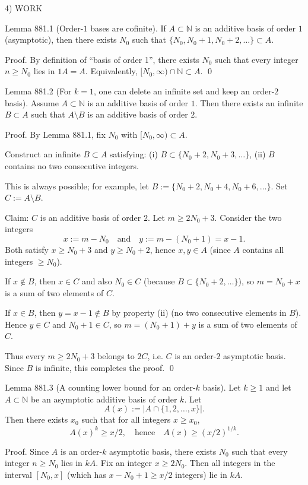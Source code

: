 4) WORK

Lemma 881.1 (Order-$1$ bases are cofinite).
If $A\subset\mathbb N$ is an additive basis of order $1$ (asymptotic), then there exists $N_0$ such that $\{N_0,N_0+1,N_0+2,\dots\}\subset A$.

Proof.
By definition of “basis of order 1”, there exists $N_0$ such that every integer $n\ge N_0$ lies in $1A=A$. Equivalently, $[N_0,\infty)\cap\mathbb N\subset A$. \qed

Lemma 881.2 (For $k=1$, one can delete an infinite set and keep an order-$2$ basis).
Assume $A\subset\mathbb N$ is an additive basis of order $1$. Then there exists an infinite $B\subset A$ such that $A\setminus B$ is an additive basis of order $2$.

Proof.
By Lemma 881.1, fix $N_0$ with $[N_0,\infty)\subset A$.

Construct an infinite $B\subset A$ satisfying:
(i) $B\subset \{N_0+2,N_0+3,\dots\}$,
(ii) $B$ contains no two consecutive integers.

This is always possible; for example, let $B:=\{N_0+2, N_0+4, N_0+6, \dots\}$.
Set $C:=A\setminus B$.

Claim: $C$ is an additive basis of order $2$.
Let $m\ge 2N_0+3$. Consider the two integers
\[x:=m-N_0\quad\text{and}\quad y:=m-(N_0+1)=x-1.\]
Both satisfy $x\ge N_0+3$ and $y\ge N_0+2$, hence $x,y\in A$ (since $A$ contains all integers $\ge N_0$).

If $x\notin B$, then $x\in C$ and also $N_0\in C$ (because $B\subset\{N_0+2,\dots\}$), so $m=N_0+x$ is a sum of two elements of $C$.

If $x\in B$, then $y=x-1\notin B$ by property (ii) (no two consecutive elements in $B$). Hence $y\in C$ and $N_0+1\in C$, so $m=(N_0+1)+y$ is a sum of two elements of $C$.

Thus every $m\ge 2N_0+3$ belongs to $2C$, i.e. $C$ is an order-$2$ asymptotic basis. Since $B$ is infinite, this completes the proof. \qed

Lemma 881.3 (A counting lower bound for an order-$k$ basis).
Let $k\ge 1$ and let $A\subset\mathbb N$ be an asymptotic additive basis of order $k$. Let
\[A(x):=|A\cap\{1,2,\dots,x\}|.\]
Then there exists $x_0$ such that for all integers $x\ge x_0$,
\[A(x)^k \ge x/2,\quad\text{hence}\quad A(x)\ge (x/2)^{1/k}.
\]

Proof.
Since $A$ is an order-$k$ asymptotic basis, there exists $N_0$ such that every integer $n\ge N_0$ lies in $kA$.
Fix an integer $x\ge 2N_0$. Then all integers in the interval $[N_0,x]$ (which has $x-N_0+1\ge x/2$ integers) lie in $kA$.

